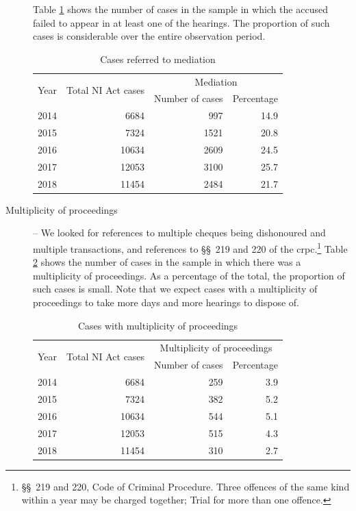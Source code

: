 \documentclass[12pt,a4paper]{article}
\begin{document}
\begin{description}
Table \ref{tab:mediation_yearWise} shows the number of cases in the sample in which the accused failed to appear in at least one of the hearings. The proportion of such cases is considerable over the entire observation period.

\begin{table}[!ht]
\caption{Cases referred to mediation}\label{tab:mediation_yearWise}
\centering
\footnotesize
\begin{tabular}{lrrr}
\toprule
\multirow{2}{*}{Year} & \multirow{2}{*}{Total NI Act cases} & \multicolumn{2}{c}{Mediation}\\
\cmidrule{3-4}
&& Number of cases & Percentage \\
\midrule%
2014 & 6684 & 997 & 14.9 \\
2015 & 7324 & 1521 & 20.8 \\
2016 & 10634 & 2609 & 24.5 \\
2017 & 12053 & 3100 & 25.7 \\
2018 & 11454 & 2484 & 21.7 \\
\bottomrule
\end{tabular}
\end{table}

\item[]

\item [Multiplicity of proceedings] -- We looked for references to multiple cheques being dishonoured and multiple transactions, and references to \S\S~219 and 220 of the \gls{crpc}.\footnote{\S\S~219 and 220, Code of Criminal Procedure. Three offences of the same kind within a year may be charged together; Trial for more than one offence.} Table \ref{tab:mult_yearWise} shows the number of cases in the sample in which there was a multiplicity of proceedings. As a percentage of the total, the proportion of such cases is small. Note that we expect cases with a multiplicity of proceedings to take more days and more hearings to dispose of.

\begin{table}[!ht]
\caption{Cases with multiplicity of proceedings} \label{tab:mult_yearWise}
\centering
\footnotesize
\begin{tabular}{lrrr}
\toprule
\multirow{2}{*}{Year} & \multirow{2}{*}{Total NI Act cases} & \multicolumn{2}{c}{Multiplicity of proceedings}\\
\cmidrule{3-4}
&& Number of cases & Percentage \\
\midrule %
2014 & 6684 & 259 & 3.9 \\
2015 & 7324 & 382 & 5.2 \\
2016 & 10634 & 544 & 5.1 \\
2017 & 12053 & 515 & 4.3 \\
2018 & 11454 & 310 & 2.7 \\
\bottomrule
\end{tabular}
\end{table}


\end{description}
\end{document}
